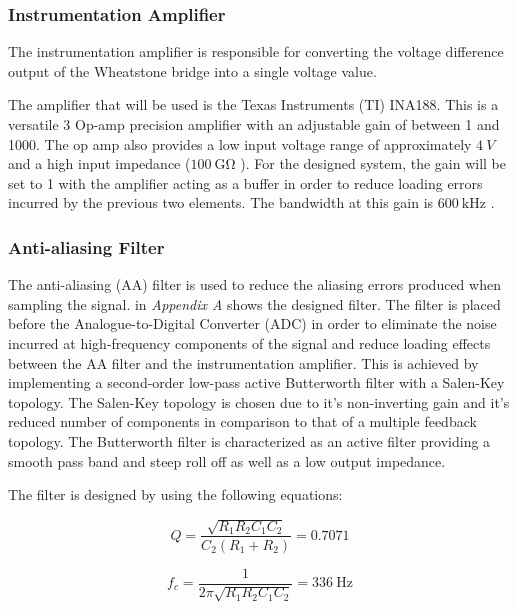 \documentclass[10pt,twocolumn]{witseiepaper}
\begin{document}
\subsubsection{Instrumentation Amplifier}

The instrumentation amplifier is responsible for converting the voltage difference output of the Wheatstone bridge into a single voltage value.

The amplifier that will be used is the Texas Instruments (TI) INA188. This is a versatile 3 Op-amp precision amplifier with an adjustable gain of between 1 and 1000. The op amp also provides a low input voltage range of approximately $4~V$ and a high input impedance ($100~\mathrm{G\Omega}$ \cite{ina188}). For the designed system, the gain will be set to 1 with the amplifier acting as a buffer in order to reduce loading errors incurred by the previous two elements. The bandwidth at this gain is $600~\mathrm{kHz}$ \cite{ina188}.

\subsubsection{Anti-aliasing Filter}

The anti-aliasing (AA) filter is used to reduce the aliasing errors produced when sampling the signal.  in \textit{Appendix A} shows the designed filter. The filter is placed before the Analogue-to-Digital Converter (ADC) in order to eliminate the noise incurred at high-frequency components of the signal and reduce loading effects between the AA filter and the instrumentation amplifier. This is achieved by implementing a second-order low-pass active Butterworth filter with a Salen-Key topology. The Salen-Key topology is chosen due to it's non-inverting gain and it's reduced number of components in comparison to that of a multiple feedback topology. The Butterworth filter is characterized as an active filter providing a smooth pass band and steep roll off as well as a low output impedance.

The filter is designed by using the following equations:

\begin{equation}
	Q =  \frac{\sqrt{R_1 R_2 C_1 C_2}}{C_2 (R_1 + R_2)} = 0.7071
\end{equation}

\begin{equation}
	f_c = \frac{1}{2 \pi \sqrt{R_1 R_2 C_1 C_2}} = 336~\mathrm{Hz}
\end{equation}
\end{document}
